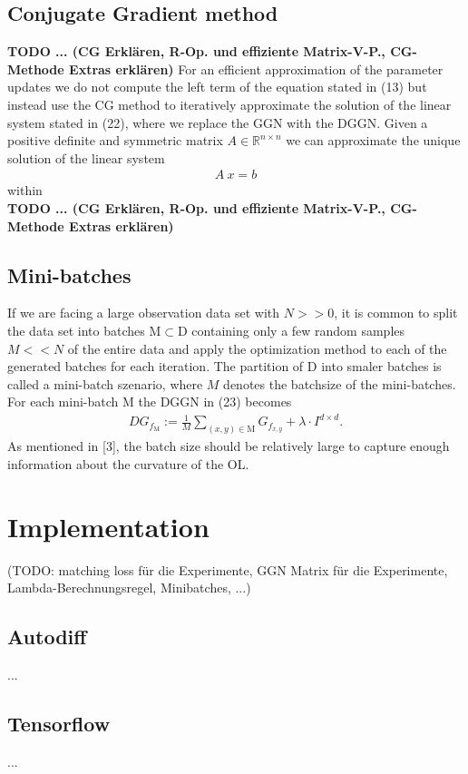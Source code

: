 \documentclass[conference]{IEEEtran}
\begin{document}
\subsection{Conjugate Gradient method}
\textbf{TODO ... (CG Erklären, R-Op. und effiziente Matrix-V-P., CG-Methode Extras erklären)}
For an efficient approximation of the parameter updates we do not compute the left term of the equation stated in (13) but instead use the CG method to iteratively approximate the solution of the linear system stated in (22), where we replace the GGN with the DGGN. Given a positive definite and symmetric matrix $A\in \mathbb{R}^{n\times n}$ we can approximate the unique solution of the linear system 
\begin{align}
A\:x = b
\end{align}
within 
\\\textbf{TODO ... (CG Erklären, R-Op. und effiziente Matrix-V-P., CG-Methode Extras erklären)}

\subsection{Mini-batches}
If we are facing a large observation data set with $N>>0$, it is common to split the data set into batches $\mathrm{M}\subset\mathrm{D}$ containing only a few random samples $M<<N$ of the entire data and apply the optimization method to each of the generated batches for each iteration. The partition of $\mathrm{D}$ into smaler batches is called a mini-batch szenario, where $M$ denotes the batchsize of the mini-batches. For each mini-batch $\mathrm{M}$ the DGGN in (23) becomes
\begin{align}
DG_{f_{\mathrm{M}}} := \frac{1}{M}\sum_{(x, y)\in \mathrm{M}}^{}G_{f_{x, y}} + \lambda\cdot I^{d\times d}.
\end{align}
As mentioned in [3], the batch size should be relatively large to capture enough information about the curvature of the OL. 

\section {Implementation}
(TODO: matching loss für die Experimente, GGN Matrix für die Experimente, Lambda-Berechnungsregel, Minibatches, ...)
\subsection{Autodiff}
...
\subsection{Tensorflow}
...
\end{document}

